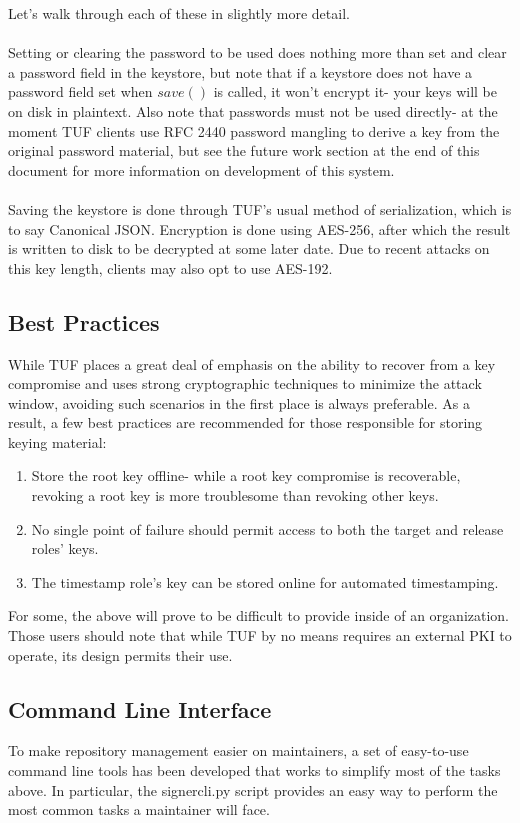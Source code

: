 \documentclass{article}
\begin{document}
Let's walk through each of these in slightly more detail.
\\\\
Setting or clearing the password to be used does nothing more than set and clear
a password field in the keystore, but note that if a keystore does not have a
password field set when $save()$ is called, it won't encrypt it- your keys will
be on disk in plaintext. Also note that passwords must not be used directly- at
the moment TUF clients use RFC 2440 password mangling to derive a key from
the original password material, but see the future work section at the end of
this document for more information on development of this system.
\\\\
Saving the keystore is done through TUF's usual method of serialization, which
is to say Canonical JSON. Encryption is done using AES-256, after which the result
is written to disk to be decrypted at some later date. Due to recent attacks on
this key length, clients may also opt to use AES-192.

\subsection{Best Practices}
While TUF places a great deal of emphasis on the ability to recover from a key 
compromise and uses strong cryptographic techniques to minimize the attack window, 
avoiding such scenarios in the first place is always preferable. As a result, a
few best practices are recommended for those responsible for storing keying
material:

\begin{enumerate}
	\item Store the root key offline- while a root key compromise is recoverable,
		revoking a root key is more troublesome than revoking other keys.
	\item No single point of failure should permit access to both the target
		and release roles' keys.
	\item The timestamp role's key can be stored online for automated timestamping.
\end{enumerate}

For some, the above will prove to be difficult to provide inside of an
organization. Those users should note that while TUF by no means requires an
external PKI to operate, its design permits their use.

\subsection{Command Line Interface}
To make repository management easier on maintainers, a set of easy-to-use command
line tools has been developed that works to simplify most of the tasks above. 
In particular, the signercli.py script provides an easy way to perform the most
common tasks a maintainer will face.
\end{document}
